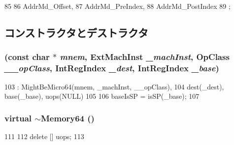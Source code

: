 \begin{DoxyCode}
85                   {
86         AddrMd_Offset,
87         AddrMd_PreIndex,
88         AddrMd_PostIndex
89     };
\end{DoxyCode}


\subsection{コンストラクタとデストラクタ}
\hypertarget{classArmISA_1_1Memory64_aac84f94b08d6107cba99c3dc98e0de10}{
\subsubsection[{Memory64}]{ (const char $\ast$ {\em mnem}, \/  {\bf ExtMachInst} {\em \_\-machInst}, \/  OpClass {\em \_\-\_\-opClass}, \/  {\bf IntRegIndex} {\em \_\-dest}, \/  {\bf IntRegIndex} {\em \_\-base})}}
\label{classArmISA_1_1Memory64_aac84f94b08d6107cba99c3dc98e0de10}



\begin{DoxyCode}
103         : MightBeMicro64(mnem, _machInst, __opClass),
104           dest(_dest), base(_base), uops(NULL)
105     {
106         baseIsSP = isSP(_base);
107     }
\end{DoxyCode}
\hypertarget{classArmISA_1_1Memory64_a534c7547153e4e2a6f67c273d5b67c47}{
\subsubsection[{$\sim$Memory64}]{\setlength{\rightskip}{0pt plus 5cm}virtual $\sim${\bf Memory64} ()}}
\label{classArmISA_1_1Memory64_a534c7547153e4e2a6f67c273d5b67c47}



\begin{DoxyCode}
111     {
112         delete [] uops;
113     }
\end{DoxyCode}


